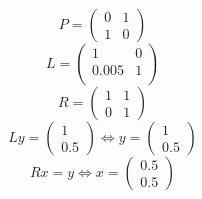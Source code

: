 \documentclass[10pt,a4paper]{article}
\begin{document}
\begin{equation}
  P = \begin{pmatrix}
    0 & 1\\
    1 & 0
  \end{pmatrix}
\end{equation}
\begin{equation}
  L = \begin{pmatrix}
    1 & 0\\
    0.005 & 1\\
  \end{pmatrix}
\end{equation}
\begin{equation}
  R = \begin{pmatrix}
    1 & 1\\
    0 & 1
  \end{pmatrix}
\end{equation}
\begin{equation}
  Ly = \begin{pmatrix}
    1\\0.5
  \end{pmatrix}
  \Leftrightarrow
  y = \begin{pmatrix}
    1\\0.5
  \end{pmatrix}
\end{equation}
\begin{equation}
  Rx = y
  \Leftrightarrow
  x = \begin{pmatrix}
    0.5\\0.5
  \end{pmatrix}
\end{equation}
\end{document}
